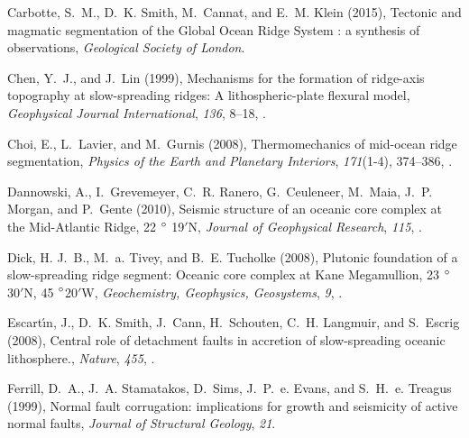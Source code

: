 \documentclass[draft,gc]{agutex}
\begin{document}
\begin{article}
\begin{thebibliography}{39}
Carbotte, S.~M., D.~K. Smith, M.~Cannat, and E.~M. Klein (2015), {Tectonic and
  magmatic segmentation of the Global Ocean Ridge System : a synthesis of
  observations}, \textit{Geological Society of London}.

Chen, Y.~J., and J.~Lin (1999), {Mechanisms for the formation of ridge-axis
  topography at slow-spreading ridges: A lithospheric-plate flexural model},
  \textit{Geophysical Journal International}, \textit{136}, 8--18,
  .

Choi, E., L.~Lavier, and M.~Gurnis (2008), {Thermomechanics of mid-ocean ridge
  segmentation}, \textit{Physics of the Earth and Planetary Interiors},
  \textit{171}(1-4), 374--386, .

Dannowski, A., I.~Grevemeyer, C.~R. Ranero, G.~Ceuleneer, M.~Maia, J.~P.
  Morgan, and P.~Gente (2010), {Seismic structure of an oceanic core complex at
  the Mid-Atlantic Ridge, 22 $\degree$ 19$'$N}, \textit{Journal of Geophysical
  Research}, \textit{115}, .

Dick, H. J.~B., M.~a. Tivey, and B.~E. Tucholke (2008), {Plutonic foundation of
  a slow-spreading ridge segment: Oceanic core complex at Kane Megamullion, 23
  $\degree$30$'$N, 45 $\degree$20$'$W}, \textit{Geochemistry, Geophysics,
  Geosystems}, \textit{9}, .

Escart\'{\i}n, J., D.~K. Smith, J.~Cann, H.~Schouten, C.~H. Langmuir, and
  S.~Escrig (2008), {Central role of detachment faults in accretion of
  slow-spreading oceanic lithosphere.}, \textit{Nature}, \textit{455},
  .

Ferrill, D.~A., J.~A. Stamatakos, D.~Sims, J.~P.~e. Evans, and S.~H.~e. Treagus
  (1999), {Normal fault corrugation: implications for growth and seismicity of
  active normal faults}, \textit{Journal of Structural Geology}, \textit{21}.


\end{thebibliography}
\end{article}
\end{document}
